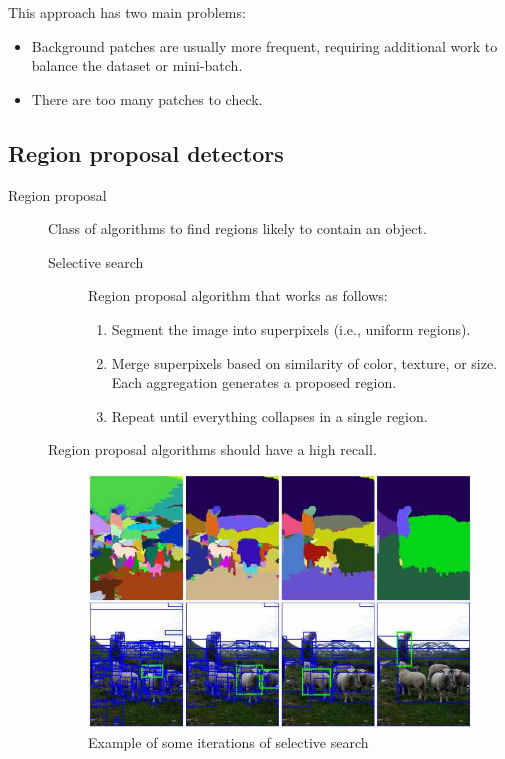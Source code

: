 \begin{description}
\begin{remark}
            This approach has two main problems:
            \begin{itemize}
                \item Background patches are usually more frequent, requiring additional work to balance the dataset or mini-batch.
                \item There are too many patches to check.
            \end{itemize}
        \end{remark}
\end{description}


\subsection{Region proposal detectors}

\begin{description}
    \item[Region proposal] 
        Class of algorithms to find regions likely to contain an object.

        \begin{description}
            \item[Selective search] 
            Region proposal algorithm that works as follows:
            \begin{enumerate}
                \item Segment the image into superpixels (i.e., uniform regions).
                \item Merge superpixels based on similarity of color, texture, or size. Each aggregation generates a proposed region.
                \item Repeat until everything collapses in a single region.
            \end{enumerate}
        \end{description}

        \begin{remark}
            Region proposal algorithms should have a high recall.
        \end{remark}

        \begin{figure}[H]
            \centering
            \includegraphics[width=0.45\linewidth]{./img/selective_search.jpg}
            \caption{Example of some iterations of selective search}
        \end{figure}


\end{description}
